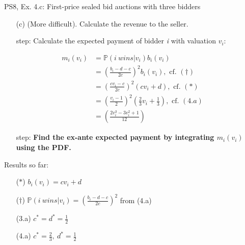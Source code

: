 \begin{frame}{PS8, Ex. 4.c: First-price sealed bid auctions with three bidders}
    \begin{itemize}
      \item[(c)] (More difficult). Calculate the revenue to the seller.
    \end{itemize}
    \vspace{-8pt}
    \begin{multicols}{2}
      \begin{itemize}
        \item[\nth{1} step:] Calculate the expected payment of bidder \textit{i} with valuation $v_i$:
      \end{itemize}
      \vspace{-10pt}
      \begin{align*}
        m_i(v_i)&=\mathbb{P}(i\ wins|v_i)b_i(v_i)\\
                &=\left(\frac{b_i-d-c}{2c}\right)^2b_i(v_i),\text{ cf. }(\dagger)\\
                &=\left(\frac{cv_i-c}{2c}\right)^2(cv_i+d),\text{ cf. }(*)\\
                &=\left(\frac{v_i-1}{2}\right)^2\left(\frac{2}{3}v_i+\frac{1}{3}\right),\text{ cf. }(4.a)\\
                &=\left(\frac{2v_i^3-3v_i^2+1}{12}\right)
      \end{align*}
      \vspace{-10pt}
      \begin{itemize}
        \item[\nth{2} step:] \textbf{Find the ex-ante expected payment by integrating $m_i(v_i)$ using the PDF.}
      \end{itemize}
      \vfill\null\columnbreak
      Results so far:
      \vspace{-6pt}
      \begin{itemize}
        \item[($*$)] $b_i(v_i) = cv_i+d$
        \item[($\dagger$)] $\mathbb{P}(i\ wins|v_i)=\left(\frac{b_i-d-c}{2c}\right)^2$ from (4.a)
        \item[(3.a)] $c^*=d^*=\frac{1}{2}$
        \item[(4.a)] $c^*=\frac{2}{3},\ d^*=\frac{1}{2}$
      \end{itemize}
      \vfill\null
    \end{multicols}
    \vfill\null
\end{frame}
